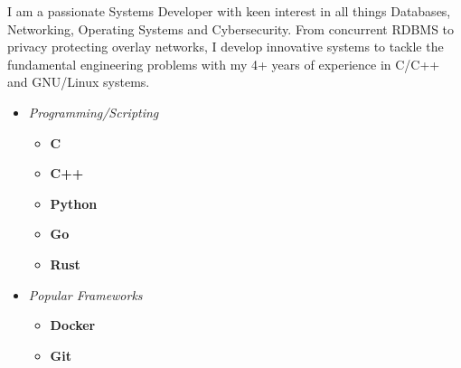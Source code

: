 \documentclass[10]{Resume}
\begin{document}
\begin{minipage}[t]{0.45\textwidth} %
	\vspace{-\baselineskip} %

		I am a passionate Systems Developer with keen interest in all things Databases, Networking, Operating Systems and Cybersecurity. From concurrent RDBMS to privacy protecting overlay networks, I develop innovative systems to tackle the fundamental engineering problems with my 4+ years of experience in C/C++ and GNU/Linux systems.
\end{minipage}
\hfill
\begin{minipage}[t]{0.45\textwidth}
	\vspace{-\baselineskip}

	\begin{itemize}[noitemsep,nolistsep,leftmargin=*]
	\setlength\itemsep{-1em}
	\item[]\textit{Programming/Scripting}
			\vspace{-1em}
			\begin{multicols}{2}
			\begin{itemize}[leftmargin=*]
			\setlength\itemsep{-0.25em}
				\item[]\textbf{C}\hspace{48pt}
				\item[]\textbf{C++}\hspace{37pt}
				\item[]\textbf{Python}\hspace{25pt}
				\item[]\textbf{Go}\hspace{28pt}
				\item[]\textbf{Rust}\hspace{21pt}
			\end{itemize}
			\end{multicols}

	\item[]\textit{Popular Frameworks}
			\vspace{-1em}
			\begin{multicols}{2}
			\begin{itemize}[leftmargin=*]
			\setlength\itemsep{-0.25em}
				\item[]\textbf{Docker}\hspace{25pt}\meter{4}
				\item[]\textbf{Git}\hspace{27pt}\meter{4}
			\end{itemize}
			\end{multicols}


\end{itemize}
\end{minipage}
\end{document}
